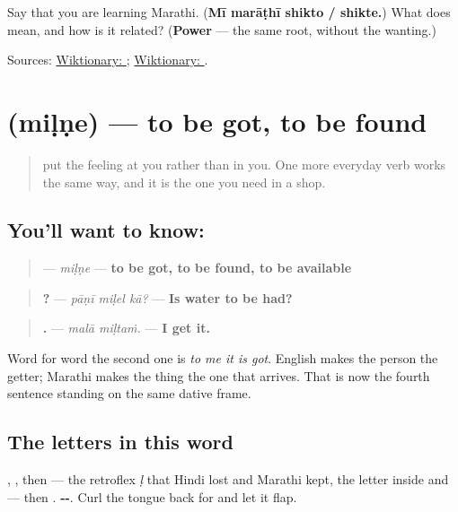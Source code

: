 \begin{tcolorbox}[breakable,colback=teal!4,colframe=teal!35!black,title={Before you move on}]
Say that you are learning Marathi. (\textbf{Mī marāṭhī shikto / shikte.}) What does \textbf{} mean, and how is it related? (\textbf{Power} — the same root, without the wanting.)

Sources: \href{https://en.wiktionary.org/wiki/\%E0\%A4\%B6\%E0\%A4\%BF\%E0\%A4\%95\%E0\%A4\%A3\%E0\%A5\%87}{Wiktionary: }; \href{https://en.wiktionary.org/wiki/\%E0\%A4\%B6\%E0\%A4\%95\%E0\%A5\%8D}{Wiktionary: }.
\end{tcolorbox}
\section[miḷṇe]{ (miḷṇe) — to be got, to be found}

\label{lesson:MR-C24-milne}



\begin{quote}
\textbf{  } put the feeling at you rather than in you. One more everyday verb works the same way, and it is the one you need in a shop.
\end{quote}

\subsection*{You'll want to know: }
\begin{quote}
\textbf{} — \emph{miḷṇe} — \textbf{to be got, to be found, to be available}
\end{quote}

\begin{quote}
\textbf{  ?} — \emph{pāṇī miḷel kā?} — \textbf{Is water to be had?}
\end{quote}

\begin{quote}
\textbf{ .} — \emph{malā miḷtaṁ.} — \textbf{I get it.}
\end{quote}

Word for word the second one is \emph{to me it is got}. English makes the person the getter; Marathi makes the thing the one that arrives. That is now the fourth sentence standing on the same dative frame.

\subsection*{The letters in this word}
\textbf{}, \textbf{}, then \textbf{} — the retroflex \emph{ḷ} that Hindi lost and Marathi kept, the letter inside \textbf{} and \textbf{} — then \textbf{}. \textbf{--}. Curl the tongue back for \textbf{} and let it flap.

